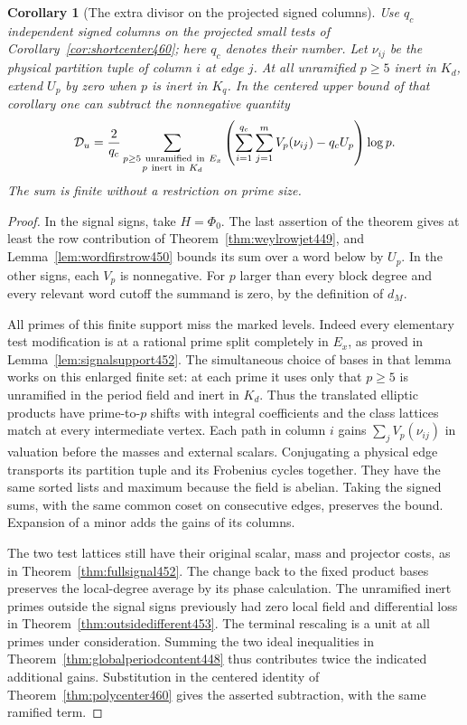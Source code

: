 \documentclass[a4paper,11pt]{article}
\newtheorem{corollary}[proposition]{Corollary}
\theoremstyle{definition}
\theoremstyle{remark}
\numberwithin{equation}{section}
\begin{document}
\begin{corollary}[The extra divisor on the projected signed columns]\leavevmode
\label{cor:inertcorrection461}
Use \(q_c\) independent signed columns on the projected small
tests of Corollary~\ref{cor:shortcenter460}; here \(q_c\)
denotes their number. Let \(\nu_{ij}\) be the physical
partition tuple of column \(i\) at edge \(j\). At all
unramified \(p\ge5\) inert in \(K_d\), extend \(U_p\) by zero
when \(p\) is inert in \(K_q\). In the centered upper bound of
that corollary one can subtract the nonnegative quantity
\[
  \mathcal D_u=\frac{2}{q_c}
   \sum_{\substack{p\ge5\ {\rm unramified\ in}\ E_x\\
                         p\ {\rm inert\ in}\ K_d}}
       \left(\sum_{i=1}^{q_c}\sum_{j=1}^m V_p(\nu_{ij})
                           -q_cU_p\right)\log p .
\]
The sum is finite without a restriction on prime size.
\end{corollary}
\begin{proof}
In the signal signs, take \(H=\Phi_0\). The last assertion of
the theorem gives at least the row contribution of
Theorem~\ref{thm:weylrowjet449}, and Lemma~\ref{lem:wordfirstrow450}
bounds its sum over a word below by \(U_p\). In the other signs,
each \(V_p\) is nonnegative. For \(p\) larger than every block
degree and every relevant word cutoff the summand is zero,
by the definition of \(d_M\).

All primes of this finite support miss the marked levels.
Indeed every elementary test modification is at a rational
prime split completely in \(E_x\), as proved in
Lemma~\ref{lem:signalsupport452}. The simultaneous choice of
bases in that lemma works on this enlarged finite set: at
each prime it uses only that \(p\ge5\) is unramified in the
period field and inert in \(K_d\). Thus the translated elliptic
products have prime-to-\(p\) shifts with integral coefficients
and the class lattices match at every intermediate vertex.
Each path in column \(i\) gains \(\sum_j V_p(\nu_{ij})\) in
valuation before the masses and external scalars. Conjugating
a physical edge transports its partition tuple and its
Frobenius cycles together. They have the same sorted lists
and maximum because the field is abelian. Taking the signed
sums, with the same common coset on consecutive edges, preserves
the bound. Expansion of a minor adds the gains of its columns.

The two test lattices still have their original scalar, mass and
projector costs, as in Theorem~\ref{thm:fullsignal452}. The change
back to the fixed product bases preserves the local-degree
average by its phase calculation. The unramified inert primes
outside the signal signs previously had zero local field and
differential loss in Theorem~\ref{thm:outsidedifferent453}.
The terminal rescaling is a unit at all primes under consideration.
Summing the two ideal inequalities in
Theorem~\ref{thm:globalperiodcontent448} thus contributes twice
the indicated additional gains. Substitution in the centered
identity of Theorem~\ref{thm:polycenter460} gives the asserted
subtraction, with the same ramified term.
\end{proof}
\end{document}
